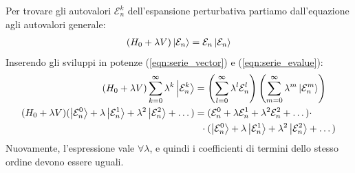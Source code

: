 \documentclass[../../FisicaTeorica.tex]{subfiles}
\begin{document}
Per trovare gli autovalori $\mathcal{E}_n^k$ dell'espansione perturbativa partiamo dall'equazione agli autovalori generale:
\begin{align*}
(H_0+\lambda V) \Ket{\mathcal{E}_n} = \mathcal{E}_n \Ket{\mathcal{E}_n}
\end{align*}
Inserendo gli sviluppi in potenze (\ref{eqn:serie_vector}) e (\ref{eqn:serie_evalue}):
\begin{align} \label{eqn:autoval_espansa}
(H_0 + \lambda V) \sum_{k=0}^{\infty} \lambda^k \Ket{\mathcal{E}_n^k} &= \left(\sum_{l=0}^\infty \lambda^l\mathcal{E}^l_n \right) \left( \sum_{m=0}^\infty \lambda^m \Ket{\mathcal{E}^m_n}\right)\\
\nonumber
(H_0 + \lambda V)(\Ket{\mathcal{E}_n^0} + \lambda\Ket{\mathcal{E}_n^1}+\lambda^2\Ket{\mathcal{E}_n^2}+\dots
) &=(\mathcal{E}_n^0 + \lambda \mathcal{E}_n^1 + \lambda^2\mathcal{E}_n^2+\dots)\cdot\\
&\>\>\,\cdot (\Ket{\mathcal{E}_n^0} + \lambda \Ket{\mathcal{E}_n^1}+\lambda^2\Ket{\mathcal{E}_n^2}+\dots)
\end{align}
Nuovamente, l'espressione vale $\forall \lambda$, e quindi i coefficienti di termini dello stesso ordine devono essere uguali.
\end{document}
